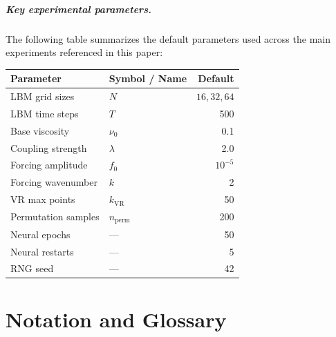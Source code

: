 \documentclass[12pt,openany]{report}
\theoremstyle{definition}
\theoremstyle{plain}
\theoremstyle{remark}
\begin{document}
\paragraph{Key experimental parameters.}
The following table summarizes the default parameters used across the
main experiments referenced in this paper:

\begin{center}
\begin{tabular}{llr}
\toprule
\textbf{Parameter} & \textbf{Symbol / Name} & \textbf{Default} \\
\midrule
LBM grid sizes & $N$ & $16, 32, 64$ \\
LBM time steps & $T$ & 500 \\
Base viscosity & $\nu_0$ & 0.1 \\
Coupling strength & $\lambda$ & 2.0 \\
Forcing amplitude & $f_0$ & $10^{-5}$ \\
Forcing wavenumber & $k$ & 2 \\
VR max points & $k_{\mathrm{VR}}$ & 50 \\
Permutation samples & $n_{\mathrm{perm}}$ & 200 \\
Neural epochs & --- & 50 \\
Neural restarts & --- & 5 \\
RNG seed & --- & 42 \\
\bottomrule
\end{tabular}
\end{center}


\chapter{Notation and Glossary}
\label{ch:notation}
\end{document}
